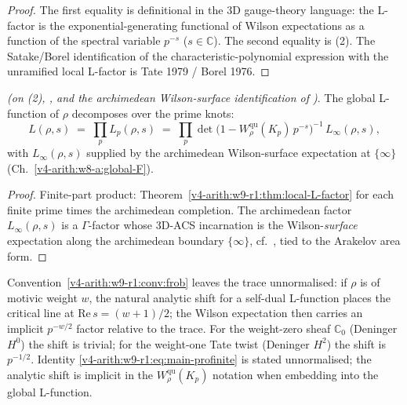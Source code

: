 \begin{proof}
The first equality is definitional in the 3D gauge-theory language:
the L-factor is the exponential-generating functional of Wilson
expectations as a function of the spectral variable \(p^{-s}\)
(\(s\in\mathbb C\)). The second equality is
(2). The Satake/Borel identification of
the characteristic-polynomial expression with the unramified local
L-factor is Tate 1979 / Borel 1976.
\end{proof}

\begin{corollary}
\label{v4-arith:w9-r1:cor:global-L}
\ClaimStatusConditional \emph{(on
(2),
, and the archimedean Wilson-surface
identification of )}. The
global L-function of \(\rho\) decomposes over the prime knots:
\begin{equation}
\label{v4-arith:w9-r1:eq:global-L}
L(\rho,s)\;=\;\prod_{p}L_{p}(\rho,s)
\;=\;\prod_{p}\det\!\bigl(1-W^{\mathrm{qu}}_{\rho}(K_{p})\,p^{-s}\bigr)^{-1}\,
L_{\infty}(\rho,s),
\end{equation}
with \(L_{\infty}(\rho,s)\) supplied by the archimedean Wilson-surface
expectation at \(\{\infty\}\) (Ch.~\ref{v4-arith:w8-a:global-F}).
\end{corollary}

\begin{proof}
Finite-part product: Theorem~\ref{v4-arith:w9-r1:thm:local-L-factor}
for each finite prime times the archimedean completion. The archimedean
factor \(L_{\infty}(\rho,s)\) is a \(\Gamma\)-factor whose 3D-ACS
incarnation is the Wilson-\emph{surface} expectation along the
archimedean boundary \(\{\infty\}\), cf.\
, tied to the Arakelov area
form.
\end{proof}

\begin{remark}
\label{v4-arith:w9-r1:rem:p-shift}
Convention~\ref{v4-arith:w9-r1:conv:frob} leaves the trace
unnormalised: if \(\rho\) is of motivic weight \(w\), the natural
analytic shift for a self-dual L-function places the critical line at
\(\mathrm{Re}\,s=(w+1)/2\); the Wilson expectation then carries an
implicit \(p^{-w/2}\) factor relative to the trace. For the weight-zero
sheaf \(\mathbb C_{0}\) (Deninger \(H^{0}\)) the shift is trivial; for
the weight-one Tate twist (Deninger \(H^{2}\)) the shift is \(p^{-1/2}\).
Identity \eqref{v4-arith:w9-r1:eq:main-profinite} is stated
unnormalised; the analytic shift is implicit in the
\(W^{\mathrm{qu}}_{\rho}(K_{p})\) notation when embedding into the global
L-function.
\end{remark}

